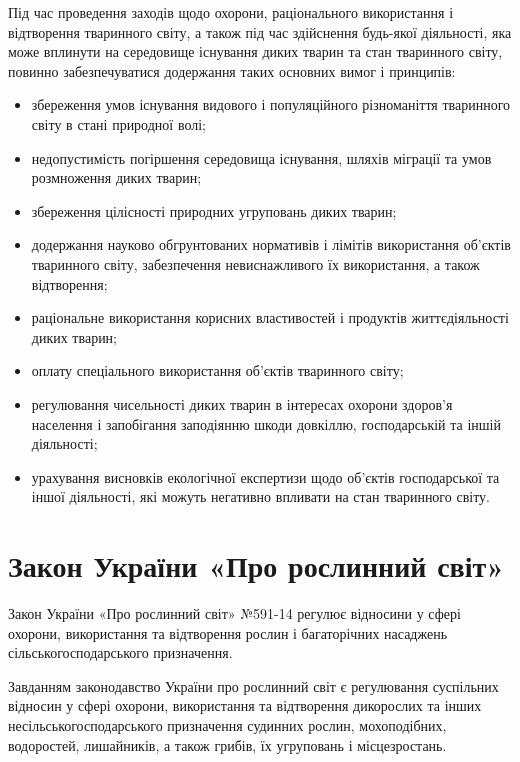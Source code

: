 \documentclass[a4paper,oneside,DIV=10,12pt]{scrreprt}
\begin{document}
			Під час проведення заходів щодо охорони, раціонального використання і відтворення тваринного світу, а також під час здійснення будь-якої діяльності, яка може вплинути на середовище існування диких тварин та стан тваринного світу, повинно забезпечуватися додержання таких основних вимог і принципів:
			\begin{itemize}
				\item збереження умов існування видового і популяційного різноманіття тваринного світу в стані природної волі;
				\item недопустимість погіршення середовища існування, шляхів міграції та умов розмноження диких тварин;
				\item збереження цілісності природних угруповань диких тварин;
				\item додержання науково обгрунтованих нормативів і лімітів використання об'єктів тваринного світу, забезпечення невиснажливого їх використання, а також відтворення;
				\item раціональне використання корисних властивостей і продуктів життєдіяльності диких тварин;
				\item оплату спеціального використання об'єктів тваринного світу;
				\item регулювання чисельності диких тварин в інтересах охорони здоров'я населення і запобігання заподіянню шкоди довкіллю, господарській та іншій діяльності;
				\item урахування висновків екологічної експертизи щодо об'єктів господарської та іншої діяльності, які можуть негативно впливати на стан тваринного світу.
				
			\end{itemize}
			
		\section{Закон України «Про рослинний світ»}
			Закон України «Про рослинний світ» №591-14 регулює відносини у сфері охорони, використання та відтворення рослин і багаторічних насаджень сільськогосподарського призначення.
			
			Завданням законодавство України про рослинний світ є регулювання суспільних відносин у сфері охорони, використання та відтворення дикорослих та інших несільськогосподарського призначення судинних рослин, мохоподібних, водоростей, лишайників, а також грибів, їх угруповань і місцезростань.
			
\end{document}
